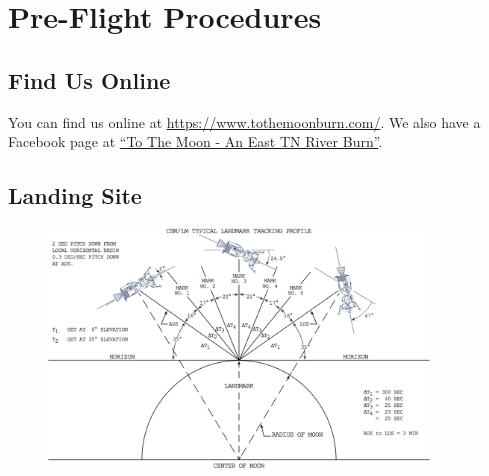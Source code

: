%
%

\chapter{Pre-Flight Procedures}

\section*{Find Us Online}

You can find us online at \url{https://www.tothemoonburn.com/}.  We also have a Facebook page at \href{https://www.facebook.com/groups/1686191044986642/?ref=bookmarks}{``To The Moon - An East TN River Burn''}.

\section*{Landing Site}

\begin{figure}[!h]
\centering
\includegraphics[width=0.9\textwidth]{images/landmarktracking.png}
\label{image:landmarktracking}
\end{figure}

